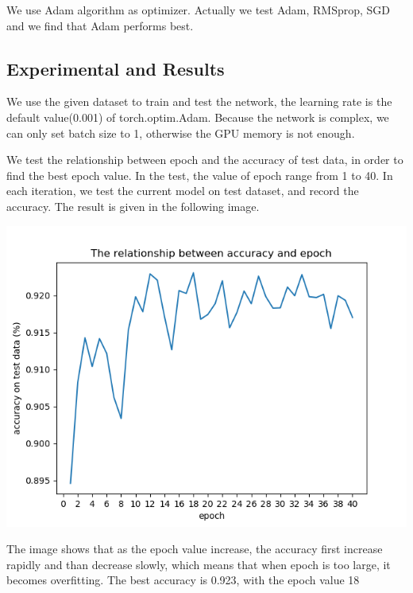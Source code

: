 We use Adam algorithm as optimizer. Actually we test Adam, RMSprop, SGD and we find that Adam performs best.

\subsection{Experimental and Results}
We use the given dataset to train and test the network, the learning rate is the default value(0.001) of torch.optim.Adam.
Because the network is complex, we can only set batch size to 1, otherwise the GPU memory is not enough.

We test the relationship between epoch and the accuracy of test data, in order to find the best epoch value. In the test, the value of epoch range from 1 to 40. 
In each iteration, we test the current model on test dataset, and record the accuracy. The result is given in the following image.

\includegraphics[width=\linewidth]{figuras/epoch_accuracy.png}

The image shows that as the epoch value increase, the accuracy first increase rapidly and than decrease slowly, 
which means that when epoch is too large, it becomes overfitting.
The best accuracy is 0.923, with the epoch value 18


